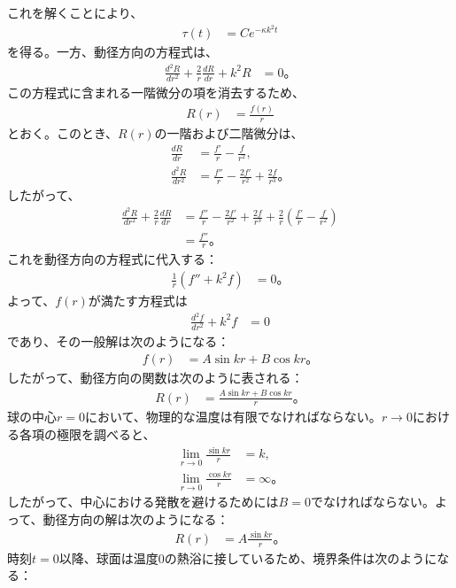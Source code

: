 \documentclass[platex,dvipdfmx,a4paper]{jsarticle}
\newcommand{\bbn}[2]{\frac{d #1}{d #2}}
\newcommand{\nbbn}[3]{\frac{d^{#1} #2}{d #3^{#1}}}
\begin{document}
  これを解くことにより、
  \begin{align*}
    \tau(t)&=C e^{-\kappa k^2t}
  \end{align*}
  を得る。一方、動径方向の方程式は、
  \begin{align*}
    \nbbn{2}{R}{r}+\frac{2}{r}\bbn{R}{r}+k^2R&=0。
  \end{align*}
  この方程式に含まれる一階微分の項を消去するため、
  \begin{align*}
    R(r)&=\frac{f(r)}{r}
  \end{align*}
  とおく。このとき、$R(r)$の一階および二階微分は、
  \begin{align*}
    \bbn{R}{r}
    &=\frac{f'}{r}-\frac{f}{r^2},\\
    \nbbn{2}{R}{r}
    &=\frac{f''}{r}-\frac{2f'}{r^2}+\frac{2f}{r^3}。
  \end{align*}
  したがって、
  \begin{align*}
    \nbbn{2}{R}{r}+\frac{2}{r}\bbn{R}{r}
    &=\frac{f''}{r}-\frac{2f'}{r^2}+\frac{2f}{r^3}
      +\frac{2}{r}\left(\frac{f'}{r}-\frac{f}{r^2}\right)\\
    &=\frac{f''}{r}。
  \end{align*}
  これを動径方向の方程式に代入する：
  \begin{align*}
    \frac{1}{r}\left(f''+k^2f\right)&=0。
  \end{align*}
  よって、$f(r)$が満たす方程式は
  \begin{align*}
    \nbbn{2}{f}{r}+k^2f&=0
  \end{align*}
  であり、その一般解は次のようになる：
  \begin{align*}
    f(r)&=A\sin kr+B\cos kr。
  \end{align*}
  したがって、動径方向の関数は次のように表される：
  \begin{align*}
    R(r)&=\frac{A\sin kr+B\cos kr}{r}。
  \end{align*}
  球の中心$r=0$において、物理的な温度は有限でなければならない。$r\to0$における各項の極限を調べると、
  \begin{align*}
    \lim_{r\to0}\frac{\sin kr}{r}&=k,\\
    \lim_{r\to0}\frac{\cos kr}{r}&=\infty。
  \end{align*}
  したがって、中心における発散を避けるためには$B=0$でなければならない。よって、動径方向の解は次のようになる：
  \begin{align*}
    R(r)&=A\frac{\sin kr}{r}。
  \end{align*}
  時刻$t=0$以降、球面は温度$0$の熱浴に接しているため、境界条件は次のようになる：
\end{document}
